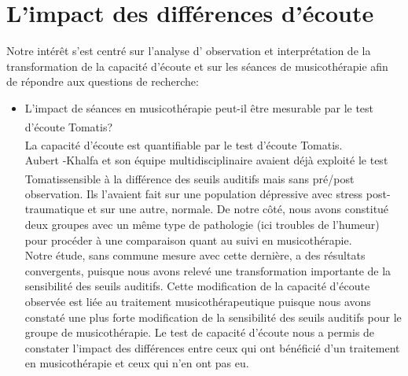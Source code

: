   \section{ L'impact des différences d'écoute }
 Notre intérêt s'est centré sur l'analyse d'
 	observation et interprétation de la transformation de la capacité d'écoute et sur les séances de 
 	musicothérapie afin de répondre aux questions de recherche: 
  \begin{itemize}
       \item L'impact de séances en musicothérapie  peut-il être mesurable par le test 
       d'écoute Tomatis\textsuperscript \textregistered?
        \\
          La capacité d'écoute est quantifiable  par le test d'écoute Tomatis.\textsuperscript \textregistered
  \\
  Aubert -Khalfa et son équipe multidisciplinaire \autocite{affectiveDisorders} avaient déjà
  exploité le test Tomatis\textsuperscript \textregistered    sensible à la différence des
  seuils auditifs mais sans pré/post observation. Ils l'avaient fait sur une population
  dépressive avec stress post-traumatique et sur une autre, normale. De notre côté, nous avons 
  constitué deux groupes avec un même type de pathologie (ici troubles de l'humeur) pour procéder à 
  une comparaison quant au suivi en musicothérapie.
    \\
  Notre étude, sans commune mesure avec cette dernière, a 
  des résultats convergents,  puisque nous avons relevé  une transformation 
  importante de la sensibilité des seuils auditifs. 
    Cette modification de la capacité d'écoute observée est liée
 au traitement musicothérapeutique 
  puisque nous avons constaté une plus forte modification de la  
 sensibilité des 
 seuils auditifs pour le groupe de musicothérapie.
Le test de capacité d'écoute nous a permis de constater l'impact des différences  entre ceux qui ont 
bénéficié d'un 
 traitement en  musicothérapie et ceux qui n'en ont pas eu.
  

\end{itemize}
